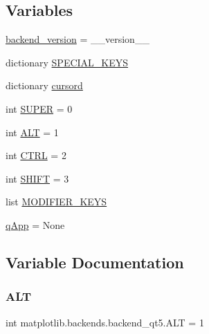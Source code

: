 \subsection*{Variables}
\begin{DoxyCompactItemize}
\item 
\hyperlink{namespacematplotlib_1_1backends_1_1backend__qt5_ac7e3dfb42ff741933f465e7391213a10}{backend\+\_\+version} = \+\_\+\+\_\+version\+\_\+\+\_\+
\item 
dictionary \hyperlink{namespacematplotlib_1_1backends_1_1backend__qt5_ad7b3597ffde4f6c232a400e85b394626}{S\+P\+E\+C\+I\+A\+L\+\_\+\+K\+E\+YS}
\item 
dictionary \hyperlink{namespacematplotlib_1_1backends_1_1backend__qt5_ac842ecc06527348892286552870f4aea}{cursord}
\item 
int \hyperlink{namespacematplotlib_1_1backends_1_1backend__qt5_a55f77d67f19399fe772d2d348586a729}{S\+U\+P\+ER} = 0
\item 
int \hyperlink{namespacematplotlib_1_1backends_1_1backend__qt5_a620c0c5356d9cd5c82f8e57b6f8cc3fb}{A\+LT} = 1
\item 
int \hyperlink{namespacematplotlib_1_1backends_1_1backend__qt5_a573e0d66fea4d8b6f3fb837f0d4f1137}{C\+T\+RL} = 2
\item 
int \hyperlink{namespacematplotlib_1_1backends_1_1backend__qt5_a6b037d25efbe0c04d0c2acdddfde339a}{S\+H\+I\+FT} = 3
\item 
list \hyperlink{namespacematplotlib_1_1backends_1_1backend__qt5_ad3f4a92471a21c2e5a960a28eb678324}{M\+O\+D\+I\+F\+I\+E\+R\+\_\+\+K\+E\+YS}
\item 
\hyperlink{namespacematplotlib_1_1backends_1_1backend__qt5_a2ed7e523076c5cd91148fd072e0136ff}{q\+App} = None
\end{DoxyCompactItemize}


\subsection{Variable Documentation}
\mbox{\label{namespacematplotlib_1_1backends_1_1backend__qt5_a620c0c5356d9cd5c82f8e57b6f8cc3fb}} 
\subsubsection{\texorpdfstring{A\+LT}{ALT}}
{\footnotesize\ttfamily int matplotlib.\+backends.\+backend\+\_\+qt5.\+A\+LT = 1}

